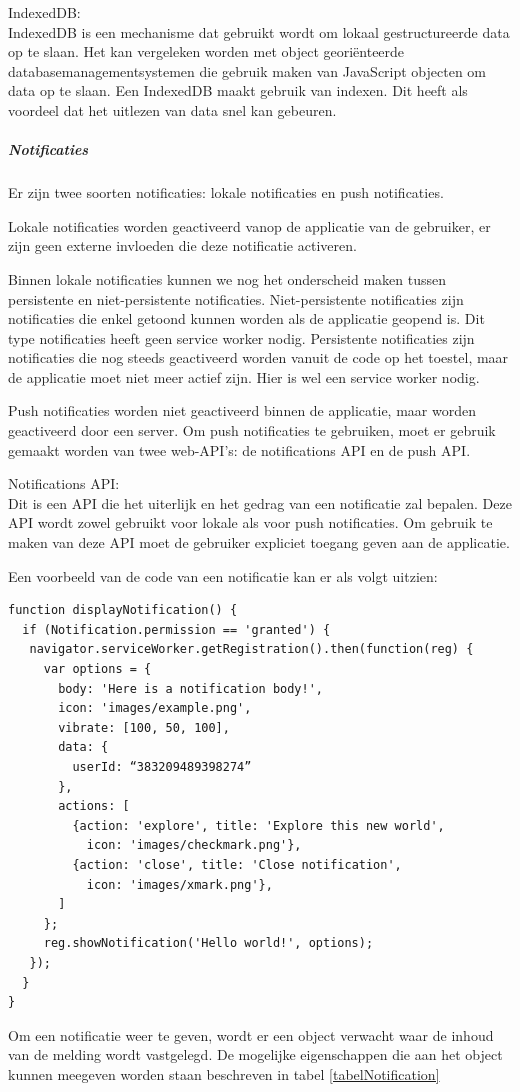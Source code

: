 			IndexedDB: \\

				IndexedDB is een mechanisme dat gebruikt wordt om lokaal gestructureerde data op te slaan. Het kan vergeleken worden met object georiënteerde databasemanagementsystemen die gebruik maken van JavaScript objecten om data op te slaan. Een IndexedDB maakt gebruik van indexen. Dit heeft als voordeel dat het uitlezen van data snel kan gebeuren.
				\autocite{Mozilla2019}
	
	
	\subparagraph{Notificaties}
	
		Er zijn twee soorten notificaties: lokale notificaties en push notificaties. 
		
		Lokale notificaties worden geactiveerd vanop de applicatie van de gebruiker, er zijn geen externe invloeden die deze notificatie activeren.
		
		Binnen lokale notificaties kunnen we nog het onderscheid maken tussen persistente en niet-persistente notificaties.
		Niet-persistente notificaties zijn notificaties die enkel getoond kunnen worden als de applicatie geopend is. Dit type notificaties heeft geen service worker nodig. 
		Persistente notificaties zijn notificaties die nog steeds geactiveerd worden vanuit de code op het toestel, maar de applicatie moet niet meer actief zijn. Hier is wel een service worker nodig.
	
		Push notificaties worden niet geactiveerd binnen de applicatie, maar worden geactiveerd door een server.
		Om push notificaties te gebruiken, moet er gebruik gemaakt worden van twee web-API's: de notifications API en de push API.
		
		Notifications API: \\
		
			Dit is een API die het uiterlijk en het gedrag van een notificatie zal bepalen. Deze API wordt zowel gebruikt voor lokale als voor push notificaties.
			Om gebruik te maken van deze API moet de gebruiker expliciet toegang geven aan de applicatie.
			
			Een voorbeeld van de code van een notificatie kan er als volgt uitzien: 
		
\begin{lstlisting}
function displayNotification() {
  if (Notification.permission == 'granted') {
   navigator.serviceWorker.getRegistration().then(function(reg) {
     var options = {
       body: 'Here is a notification body!',
       icon: 'images/example.png',
       vibrate: [100, 50, 100],
       data: {
         userId: “383209489398274”
       },
       actions: [
         {action: 'explore', title: 'Explore this new world',
           icon: 'images/checkmark.png'},
         {action: 'close', title: 'Close notification',
           icon: 'images/xmark.png'},
       ]
     };
     reg.showNotification('Hello world!', options);
   });
  }
}
\end{lstlisting}
			Om een notificatie weer te geven, wordt er een object verwacht waar de inhoud van de melding wordt vastgelegd. De mogelijke eigenschappen die aan het object kunnen meegeven worden staan beschreven in tabel \ref{tabelNotification}
			

